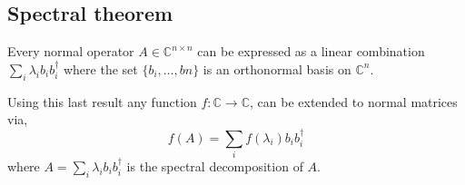 \subsection{Spectral theorem}

\begin{theorem}  \cite{nielsen2010quantum}
  Every normal operator $A \in \mathbb{C}^{n \times n} $ can be expressed as a linear combination $\sum_{i} \lambda_{i}b_{i}b_{i}^{\dag}$ where the set $\{b_{i}, \ldots , b{n}\}$ is an orthonormal basis on $\mathbb{C}^{n}$.
\end{theorem}

Using this last result any function $f:\mathbb{C} \xrightarrow{} \mathbb{C}$, can be extended to normal matrices via,
  \begin{equation} \label{eq:apply_f_diag} 
    f(A) = \sum_{i} f(\lambda_{i})b_{i}b_{i}^{\dag}
\end {equation}
where $A = \sum_{i} \lambda_{i}b_{i}b_{i}^{\dag}$ is the spectral decomposition of $A$.

